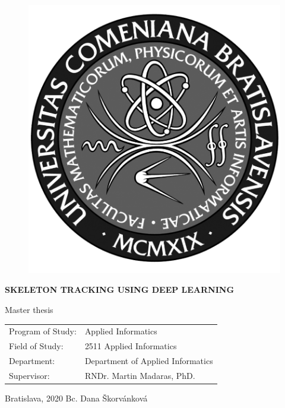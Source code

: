 \documentclass[12pt, a4paper, oneside]{book}
\newcommand\mftitle{Skeleton Tracking using Deep Learning}
\newcommand\mfthesistype{Master thesis}
\newcommand\mfauthor{Bc. Dana Škorvánková}
\newcommand\mfadvisor{RNDr. Martin Madaras, PhD.}
\newcommand\mfplacedate{Bratislava, 2020}
\begin{document}
\vfill
\begin{figure}[!hbt]
\begin{center}
\includegraphics{images/logo_fmph_dark}
\label{img:logo_dark}
\end{center}
\end{figure}
\begin{center}
\begin{minipage}{0.8\textwidth}
\centerline{\textbf{\Large\MakeUppercase{\mftitle}}}
\smallskip
\centerline{\mfthesistype}
\end{minipage}
\end{center}
\vfill
\begin{tabular}{l l}
Program of Study: & Applied Informatics\\
Field of Study: & 2511 Applied Informatics\\
Department: & Department of Applied Informatics\\
Supervisor: & \mfadvisor
\end{tabular}
\vfill
\noindent
\mfplacedate \hfill
\mfauthor
\eject 

\end{document}
